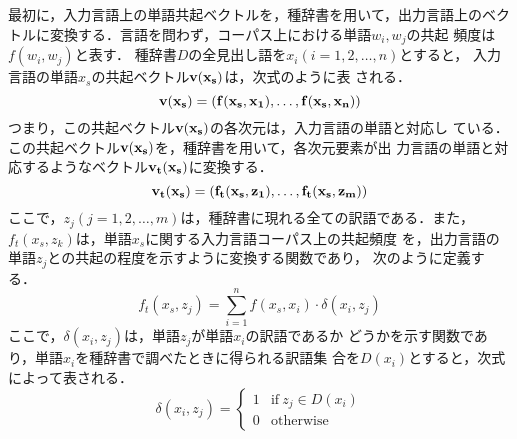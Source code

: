 \documentclass[japanese]{jnlp_1.4}
\begin{document}
最初に，入力言語上の単語共起ベクトルを，種辞書を用いて，出力言語上のベク
トルに変換する．言語を問わず，コーパス上における単語$w_{i},w_{j}$の共起
頻度は$f(w_{i},w_{j})$と表す．
種辞書$D$の全見出し語を$x_{i}(i=1,2,\ldots,n)$とすると，
入力言語の単語$x_{s}$の共起ベクトル$\bf{v}(x_{s})$は，次式のように表
される．
\begin{equation}
  \bf{v}(x_{s}) = (f(x_{s},x_{1}),\ldots,f(x_{s},x_{n}))
    \label{eq:src_vector}
\end{equation}
つまり，この共起ベクトル$\bf{v}(x_{s})$の各次元は，入力言語の単語と対応し
ている．この共起ベクトル$\bf{v}(x_{s})$を，種辞書を用いて，各次元要素が出
力言語の単語と対応するようなベクトル$\bf{v}_{t}(x_{s})$に変換する．
\begin{equation}
  \bf{v}_{t}(x_{s}) = (f_{t}(x_{s},z_{1}),\ldots,f_{t}(x_{s},z_{m}))
    \label{eq:trans_vector}
\end{equation}
ここで，$z_{j}(j=1,2,\ldots,m)$は，種辞書に現れる全ての訳語である．また，
$f_{t}(x_{s},z_{k})$は，単語$x_{s}$に関する入力言語コーパス上の共起頻度
を，出力言語の単語$z_{j}$との共起の程度を示すように変換する関数であり，
次のように定義する．
\begin{equation}
  f_{t}(x_{s},z_{j}) = \sum_{i=1}^{n}f(x_{s},x_{i})\cdot\delta(x_{i},z_{j})
\end{equation}
ここで，$\delta(x_{i},z_{j})$は，単語$z_{j}$が単語$x_{i}$の訳語であるか
どうかを示す関数であり，単語$x_{i}$を種辞書で調べたときに得られる訳語集
合を$D(x_{i})$とすると，次式によって表される．
\begin{equation}
  \delta(x_{i},z_{j}) = \begin{cases}
			   1 & \mbox{if}\ z_{j}\in D(x_{i})\\
			   0 & \mbox{otherwise}
			 \end{cases}
\end{equation}
\end{document}
